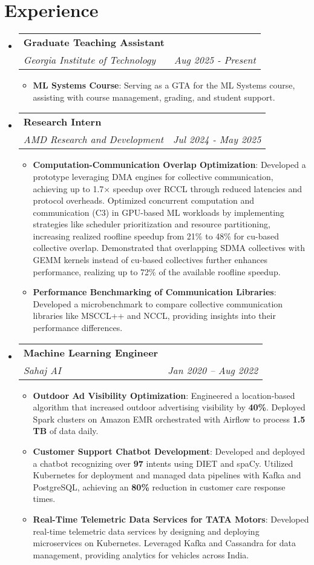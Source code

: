 \documentclass[a4paper,20pt]{article}
\makeatletter
\newcommand{\resumeItem}[2]{
  \item\small{
    \textbf{#1}{: #2 \vspace{-2pt}}
  }
}
\newcommand{\resumeSubheading}[4]{
  \vspace{-1pt}\item
    \begin{tabular*}{0.97\textwidth}{l@{\extracolsep{\fill}}r}
      \textbf{#1} & #2 \\
      \textit{#3} & \textit{#4} \\
    \end{tabular*}\vspace{-5pt}
}
\newcommand{\resumeSubHeadingListStart}{\begin{itemize}[leftmargin=*]}
\newcommand{\resumeSubHeadingListEnd}{\end{itemize}}
\newcommand{\resumeItemListStart}{\begin{itemize}}
\newcommand{\resumeItemListEnd}{\end{itemize}\vspace{-5pt}}
\makeatother
\begin{document}
\vspace{-5pt}


\section{Experience}
  \resumeSubHeadingListStart
    \resumeSubheading{Graduate Teaching Assistant}{}
      {Georgia Institute of Technology}{Aug 2025 - Present}
      \resumeItemListStart
        \resumeItem{\textbf{ML Systems Course}}{Serving as a GTA for the ML Systems course, assisting with course management, grading, and student support.}
      \resumeItemListEnd

    \resumeSubheading{Research Intern}{}
      {AMD Research and Development}{Jul 2024 - May 2025}
      \resumeItemListStart
              \resumeItem{\textbf{Computation-Communication Overlap Optimization}}{Developed a prototype leveraging DMA engines for collective communication, achieving up to 1.7× speedup over RCCL through reduced latencies and protocol overheads. Optimized concurrent computation and communication (C3) in GPU-based ML workloads by implementing strategies like scheduler prioritization and resource partitioning, increasing realized roofline speedup from 21\% to 48\% for cu-based collective overlap. Demonstrated that overlapping SDMA collectives with GEMM kernels instead of cu-based collectives further enhances performance, realizing up to 72\% of the available roofline speedup.}
        \resumeItem{\textbf{Performance Benchmarking of Communication Libraries}}{Developed a microbenchmark to compare collective communication libraries like MSCCL++ and NCCL, providing insights into their performance differences.}

      \resumeItemListEnd


    \resumeSubheading{Machine Learning Engineer}{}
      {Sahaj AI}{Jan 2020 -- Aug 2022}
      \resumeItemListStart
        \resumeItem{\textbf{Outdoor Ad Visibility Optimization}}{Engineered a location-based algorithm that increased outdoor advertising visibility by \textbf{40\%}. Deployed Spark clusters on Amazon EMR orchestrated with Airflow to process \textbf{1.5 TB} of data daily.}
        \resumeItem{\textbf{Customer Support Chatbot Development}}{Developed and deployed a chatbot recognizing over \textbf{97} intents using DIET and spaCy. Utilized Kubernetes for deployment and managed data pipelines with Kafka and PostgreSQL, achieving an \textbf{80\%} reduction in customer care response times.}
        \resumeItem{\textbf{Real-Time Telemetric Data Services for TATA Motors}}{Developed real-time telemetric data services by designing and deploying microservices on Kubernetes. Leveraged Kafka and Cassandra for data management, providing analytics for vehicles across India.}
      \resumeItemListEnd
  \resumeSubHeadingListEnd
\end{document}
